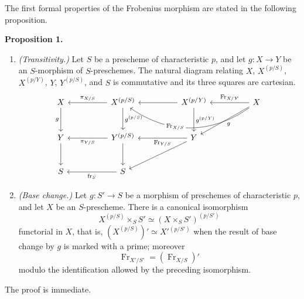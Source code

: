 \documentclass[11pt]{article}
\newenvironment{statement}[1]{\par\medskip\noindent\textbf{#1.}\ }{\par\medskip}
\providecommand{\fr}{\operatorname{fr}}
\providecommand{\Fr}{\operatorname{Fr}}
\providecommand{\Fr}{\operatorname{Fr}}
\providecommand{\fr}{\operatorname{fr}}
\begin{document}
The first formal properties of the Frobenius morphism are stated in the following proposition.

\label{sga5:XV:proposition:1}\begin{statement}{Proposition 1}
\begin{enumerate}[label=\alph*)]
\item \emph{(Transitivity.)} Let $S$ be a prescheme of characteristic $p$, and let $g:X\to Y$ be an $S$-morphism of $S$-preschemes. The natural diagram relating $X$, $X^{(p/S)}$, $X^{(p/Y)}$, $Y$, $Y^{(p/S)}$, and $S$ is commutative and its three squares are cartesian.
\[
\begin{tikzcd}[column sep=huge,row sep=large]
X \arrow[d,"g"'] & X^{(p/S)} \arrow[l,"\pi_{X/S}"'] \arrow[d,"g^{(p/S)}"] & X^{(p/Y)} \arrow[l] \arrow[d,"g^{(p/Y)}"] & X \arrow[l,"\Fr_{X/Y}"'] \arrow[ll,bend left=35,"\Fr_{X/S}"{description,pos=0.62}] \arrow[dl,"g"] \\
Y \arrow[d] & Y^{(p/S)} \arrow[l,"\pi_{Y/S}"] \arrow[d] & Y \arrow[l,"\Fr_{Y/S}"] \arrow[dl] & {} \\
S & S \arrow[l,"\fr_S"] & {} & {}
\end{tikzcd}
\]

\item \emph{(Base change.)} Let $g:S'\to S$ be a morphism of preschemes of characteristic $p$, and let $X$ be an $S$-prescheme. There is a canonical isomorphism
\[
X^{(p/S)}\times_S S'\simeq (X\times_S S')^{(p/S')}
\]
functorial in $X$, that is, $(X^{(p/S)})'\simeq X'{}^{(p/S')}$ when the result of base change by $g$ is marked with a prime; moreover
\[
\Fr_{X'/S'}=(\Fr_{X/S})'
\]
modulo the identification allowed by the preceding isomorphism.
\end{enumerate}
\end{statement}

The proof is immediate.
\end{document}

